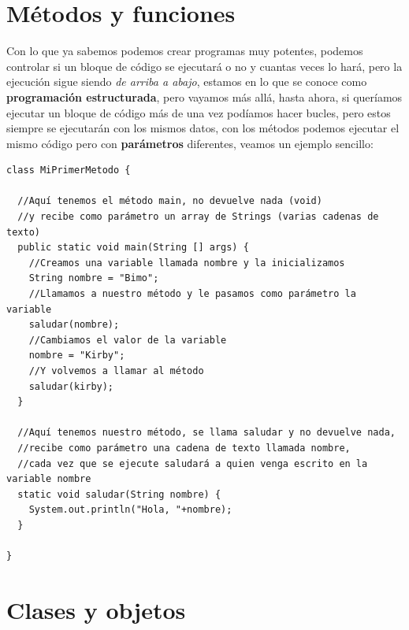 \documentclass[11pt]{article}
\begin{document}
\section{Métodos y funciones}
\label{sec:org74514ef}
Con lo que ya sabemos podemos crear programas muy potentes, podemos controlar si un bloque de código se ejecutará o no y cuantas veces lo hará, pero la ejecución sigue siendo \emph{de arriba a abajo}, estamos en lo que se conoce como \textbf{programación estructurada}, pero vayamos más allá, hasta ahora, si queríamos ejecutar un bloque de código más de una vez podíamos hacer bucles, pero estos siempre se ejecutarán con los mismos datos, con los métodos podemos ejecutar el mismo código pero con \textbf{parámetros} diferentes, veamos un ejemplo sencillo:

\begin{verbatim}
class MiPrimerMetodo {

  //Aquí tenemos el método main, no devuelve nada (void)
  //y recibe como parámetro un array de Strings (varias cadenas de texto)
  public static void main(String [] args) {
    //Creamos una variable llamada nombre y la inicializamos
    String nombre = "Bimo";
    //Llamamos a nuestro método y le pasamos como parámetro la variable
    saludar(nombre);
    //Cambiamos el valor de la variable
    nombre = "Kirby";
    //Y volvemos a llamar al método
    saludar(kirby);
  }

  //Aquí tenemos nuestro método, se llama saludar y no devuelve nada,
  //recibe como parámetro una cadena de texto llamada nombre,
  //cada vez que se ejecute saludará a quien venga escrito en la variable nombre
  static void saludar(String nombre) {
    System.out.println("Hola, "+nombre);
  }

}
\end{verbatim}

\section{Clases y objetos}
\label{sec:org32b502a}
\end{document}
